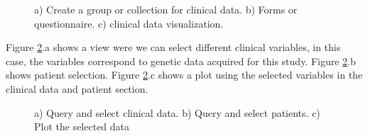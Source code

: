 \documentclass[]{spie}  %
\begin{document}
\begin{figure}
	\centering 
	\caption[Import and generate clinical data]{a) Create a group or collection for clinical data. b) Forms or questionnaire. c) clinical data visualization.}
	\label{fig:gnerateClinicalData}
\end{figure} 

Figure \ref{fig:queryAndSelect}.a shows a view were we can select different clinical variables, in this case, the variables correspond to genetic data
acquired for this study. Figure \ref{fig:queryAndSelect}.b shows patient selection. Figure \ref{fig:queryAndSelect}.c shows a plot using the selected 
variables in the clinical data and patient section. 

\begin{figure}
	\centering 
	\caption[Import and generate clinical data]{a) Query and select clinical data. b) Query and select patients. c) Plot the selected data}
	\label{fig:queryAndSelect}
\end{figure} 
\end{document}
